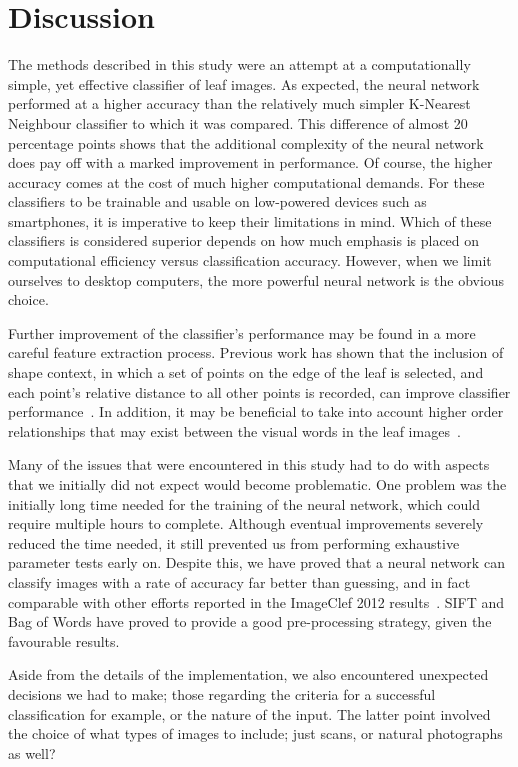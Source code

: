 \section{Discussion}
The methods described in this study were an attempt at a computationally simple, yet effective classifier of leaf images.
As expected, the neural network performed at a higher accuracy than the relatively much simpler K-Nearest Neighbour classifier to which it was compared.
This difference of almost 20 percentage points shows that the additional complexity of the neural network does pay off with a marked improvement in performance.
Of course, the higher accuracy comes at the cost of much higher computational demands.
For these classifiers to be trainable and usable on low-powered devices such as smartphones, it is imperative to keep their limitations in mind.
Which of these classifiers is considered superior depends on how much emphasis is placed on computational efficiency versus classification accuracy.
However, when we limit ourselves to desktop computers, the more powerful neural network is the obvious choice.

Further improvement of the classifier's performance may be found in a more careful feature extraction process.
Previous work has shown that the inclusion of shape context, in which a set of points on the edge of the leaf is selected, and each point's relative distance to all other points is recorded, can improve classifier performance~\cite{Wang2011}.
In addition, it may be beneficial to take into account higher order relationships that may exist between the visual words in the leaf images~\cite{Huan2015}.

Many of the issues that were encountered in this study had to do with aspects that we initially did not expect would become problematic. One problem was the initially long time needed for the training of the neural network, which could require multiple hours to complete. Although eventual improvements severely reduced the time needed, it still prevented us from performing exhaustive parameter tests early on. Despite this, we have proved that a neural network can classify images with a rate of accuracy far better than guessing, and in fact comparable with other efforts reported in the ImageClef 2012 results~\cite{imageclef2012}. SIFT and Bag of Words have proved to provide a good pre-processing strategy, given the favourable results.

Aside from the details of the implementation, we also encountered unexpected decisions we had to make; those regarding the criteria for a successful classification for example, or the nature of the input. The latter point involved the choice of what types of images to include; just scans, or natural photographs as well?

